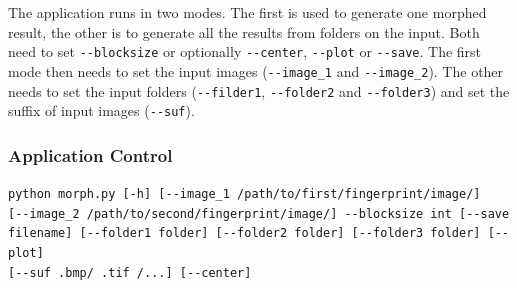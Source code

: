 The application runs in two modes. The first is used to generate one morphed result, the other is to generate all the results from folders on the input. Both need to set \texttt{-{}-blocksize} or optionally \texttt{-{}-center}, \texttt{-{}-plot} or \texttt{-{}-save}. The first mode then needs to set the input images (\texttt{-{}-image\_1} and \texttt{-{}-image\_2}). The other needs to set the input folders (\texttt{-{}-filder1}, \texttt{-{}-folder2} and \texttt{-{}-folder3}) and set the suffix of input images (\texttt{-{}-suf}).

\subsubsection{Application Control}
\texttt{python morph.py [-h] [-{}-image\_1 /path/to/first/fingerprint/image/]} \\ \texttt{[-{}-image\_2 /path/to/second/fingerprint/image/] -{}-blocksize int [-{}-save \\ filename] [-{}-folder1 folder] [-{}-folder2 folder] [-{}-folder3 folder] [-{}-plot]} \\ \texttt{[-{}-suf .bmp/ .tif /...] [-{}-center]}

